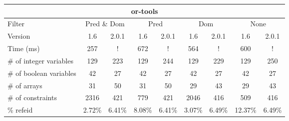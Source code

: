 \documentclass{standalone}
\begin{document}
\begin{tabular}{lc|c|c|c|c|c|c|c}
\multicolumn{9}{c}{or-tools} \\ 
\hline\hline Filter & \multicolumn{2}{c|}{Pred \& Dom} &\multicolumn{2}{c|}{Pred}  & \multicolumn{2}{c|}{Dom} & \multicolumn{2}{c}{None} \\ 
\hline Version & 1.6 & 2.0.1 & 1.6 & 2.0.1 & 1.6 & 2.0.1 & 1.6 & 2.0.1 \\ 
Time (ms)               & 257 & ! & 672 & ! & 564 & ! & 600 & ! \\ 
\# of integer variables & 129 & 223 & 129 & 244 & 129 & 229 & 129 & 250 \\ 
\# of boolean variables & 42 & 27 & 42 & 27 & 42 & 27 & 42 & 27 \\ 
\# of arrays            & 31 & 50 & 31 & 50 & 29 & 43 & 29 & 43 \\ 
\# of constraints       & 2316 & 421 & 779 & 421 & 2046 & 416 & 509 & 416 \\ 
\% refeid               & 2.72\% & 6.41\% & 8.08\% & 6.41\% & 3.07\% & 6.49\% & 12.37\% & 6.49\% \\ 
\end{tabular} 
\end{document}
